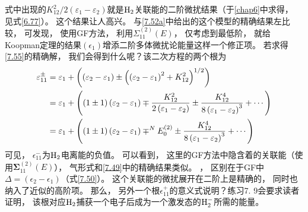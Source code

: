 式中出现的${K_{12}^{2}}/{2\left(\varepsilon_{1}-\varepsilon_{2}\right)}$就是$\mathrm{H}_2$关联能的二阶微扰结果（于\ref{chap6}中求得，
见式\eqref{6.77}）。
这个结果让人高兴。
与\eqref{7.52a}中给出的这个模型的精确结果左比较，
可发现，
使用GF方法，
利用$\Sigma_{11}^{(2)}(E)$，
仅考虑到最低阶，
就给Koopman定理的结果$(\epsilon_1)$增添二阶多体微扰论能量这样一个修正项。
若求得\eqref{7.55}的精确解，
我们会得到什么呢？该二次方程的两个根为
\begin{align}
\varepsilon_{11}^{\pm} &=\varepsilon_{1}+\left(\left(\varepsilon_{2}-\varepsilon_{1}\right) \pm\left(\left(\varepsilon_{2}-\varepsilon_{1}\right)^{2}+K_{12}^{2}\right)^{1 / 2}\right) \notag\\
&=\varepsilon_{1}+\left((1 \pm 1)\left(\varepsilon_{2}-\varepsilon_{1}\right) \mp \frac{K_{12}^{2}}{2\left(\varepsilon_{1}-\varepsilon_{2}\right)} \pm \frac{K_{12}^{4}}{8\left(\varepsilon_{1}-\varepsilon_{2}\right)^{3}}+\cdots\right) \notag\\
&=\varepsilon_{1}+\left((1 \pm 1)\left(\varepsilon_{2}-\varepsilon_{1}\right) \mp^{N} E_{0}^{(2)} \pm \frac{K_{12}^{4}}{8\left(\varepsilon_{1}-\varepsilon_{2}\right)^{3}}+\cdots\right)
\end{align}
可见，
$\epsilon_{11}^-$为$\mathrm{H}_2$电离能的负值。
可以看到，
这里的GF方法中隐含着的关联能（使用$\mathbf{\Sigma}_{11}^{(2)}(E)$），
气形式和\eqref{7.49}中的精确结果类似。
，
区别在于GF中$\Delta=(\epsilon_{2}-\epsilon_1)$（式\eqref{7.50}）。
这个关联能的微扰展开在二阶上是精确的，
同时也纳入了近似的高阶项。
那么，
另外一个根$\epsilon_{11}^+$的意义式说明？练习7.
9会要求读者证明，
该根对应$\mathrm{H}_2$捕获一个电子后成为一个激发态的$\mathrm{H}_2^-$所需的能量。

